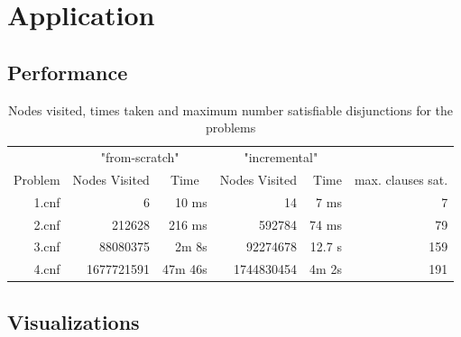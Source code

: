 \documentclass[10pt]{article}
\begin{document}
\section{Application}

\subsection{Performance}
\label{sec:scratch-vs-incremental}
\begin{table}[H] \centering
\begin{tabular}{r | *2{r r} | r }
\hline\hline
        & \multicolumn{2}{c|}{"from-scratch"} & \multicolumn{2}{c|}{"incremental"} \\
Problem & Nodes Visited & \multicolumn{1}{c|}{Time} & Nodes Visited & Time & max. clauses sat.\\
\hline
1.cnf & 6          &   10 ms &         14 & 7 ms & 7 \\
2.cnf & 212628     &  216 ms &     592784 & 74 ms & 79 \\
3.cnf & 88080375   &   2m 8s &   92274678 & 12.7 s & 159 \\
4.cnf & 1677721591 & 47m 46s & 1744830454 & 4m 2s & 191 \\
\hline
\end{tabular}
\caption{Nodes visited, times taken and maximum number satisfiable disjunctions for the problems}
\end{table}

\subsection{Visualizations}
\begin{figure}[H]
\centering
{}
\end{figure}
\end{document}
